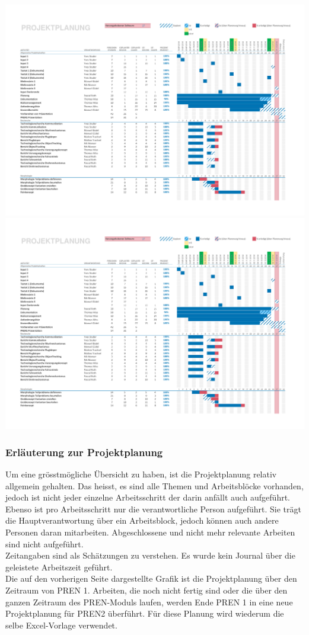 \begin{landscape}
    \includegraphics[page=1,scale=0.8,clip,trim=15mm 22mm 13mm 18mm] {Enddokumentation/Projektplanung_Management/Bilder/Projekt-Planung_Team32.pdf}
    \newpage
    \includegraphics[page=2,scale=0.8,clip,trim=15mm 100mm 13mm 10mm] {Enddokumentation/Projektplanung_Management/Bilder/Projekt-Planung_Team32.pdf}
    \newpage
\end{landscape}
\subsubsection{Erläuterung zur Projektplanung}
Um eine grösstmögliche Übersicht zu haben, ist die Projektplanung relativ allgemein gehalten. Das heisst, es sind alle Themen und Arbeitsblöcke vorhanden, jedoch ist nicht jeder einzelne Arbeitsschritt der darin anfällt auch aufgeführt. Ebenso ist pro Arbeitsschritt nur die verantwortliche Person aufgeführt. Sie trägt die Hauptverantwortung über ein Arbeitsblock, jedoch können auch andere Personen daran mitarbeiten. Abgeschlossene und nicht mehr relevante Arbeiten sind nicht aufgeführt.\\
Zeitangaben sind als Schätzungen zu verstehen. Es wurde kein Journal über die geleistete Arbeitszeit geführt.\\
Die auf den vorherigen Seite dargestellte Grafik ist die Projektplanung über den Zeitraum von PREN 1. Arbeiten, die noch nicht fertig sind oder die über den ganzen Zeitraum des PREN-Moduls laufen, werden Ende PREN 1 in eine neue Projektplanung für PREN2 überführt. Für diese Planung wird wiederum die selbe Excel-Vorlage verwendet. 
